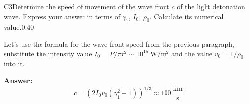 \documentclass[11pt,a4paper]{article}
\begin{document}
\begin{solcard}{C3}{Determine the speed of movement of the wave front $c$ of the light detonation wave. Express your answer in terms of $\gamma_1$, $I_0$, $\rho_0$. Calculate its numerical value.}{0.40}

Let's use the formula for the wave front speed from the previous paragraph, substitute the intensity value $I_0 = P/\pi r^2 \sim 10^{15}~\text{W}/\text{m}^2$ and the value $v_0 = 1/\rho_0$ into it.

\par\smallskip\noindent\textbf{Answer:} $$ c =  \left(2 I_0 v_0 (\gamma_1^2 -1) \right)^{1/3} \approx 100 ~\frac{\text{km}}{\text{s}} $$
\end{solcard}
\end{document}
